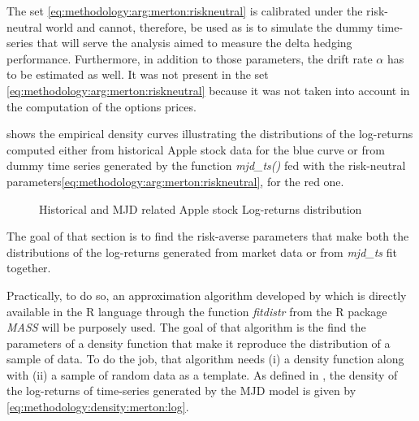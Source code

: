 \documentclass[12pt]{report}
\begin{document}
The set \ref{eq:methodology:arg:merton:riskneutral} is calibrated under the risk-neutral world and cannot, therefore, be used as is to simulate the dummy time-series that will serve the analysis aimed to measure the delta hedging performance.
Furthermore, in addition to those parameters, the drift rate $\alpha$ has to be estimated as well. It was not present in the set  \ref{eq:methodology:arg:merton:riskneutral} because it was not taken into account in the computation of the options prices.

 shows the empirical density curves illustrating the distributions of the log-returns computed either from historical Apple stock data for the blue curve or from dummy time series generated by the function \textit{mjd\_ts()} fed with the risk-neutral parameters\ref{eq:methodology:arg:merton:riskneutral}, for the red one.


\begin{figure}[h]
  \centering
  
  \caption{Historical and MJD related Apple stock Log-returns distribution}
  \label{p:methodology:density:aapl:merton:riskneutral}
\end{figure}



The goal of that section is to find the risk-averse parameters that make both the distributions of the log-returns generated from market data or from \textit{mjd\_ts} fit together.

Practically, to do so, an approximation algorithm developed by \citet{MASS} which is directly available in the R language through the function \textit{fitdistr} from the R package \textit{MASS} will be purposely used. 
The goal of that algorithm is the find the parameters of a density function that make it reproduce the distribution of a sample of data.
To do the job, that algorithm needs (i) a density function along with (ii) a sample of random data as a template.
As defined in \citet{matsuda2004}, the density of the log-returns of time-series generated by the MJD model is given by \cref{eq:methodology:density:merton:log}.
\end{document}
